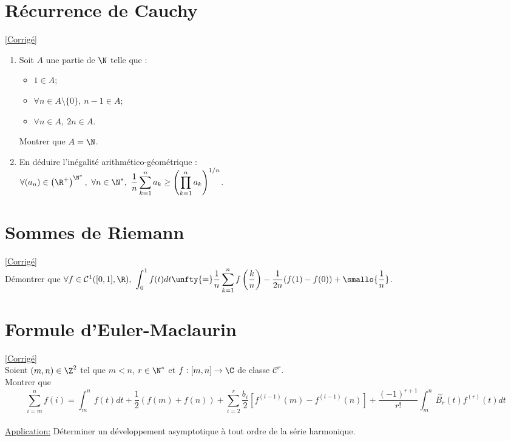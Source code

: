 \documentclass{book}
\begin{document}
	\section{Récurrence de Cauchy }
	\textcolor{blue}{\hyperref[sec:recurrence-de-cauchy]{[Corrigé]}}\\
	\label{Récurrence de Cauchy}
	\begin{enumerate}[leftmargin=*]
		\item Soit $A$ une partie de $\N$ telle que :
		\begin{itemize}
			\item $1\in A$;
			\item $\forall n\in A\setminus\{0\},\ n-1\in A$;
			\item $\forall n\in A,\ 2n\in A$.
		\end{itemize}
		Montrer que $A=\N$.
		\item En déduire l'inégalité arithmético-géométrique :\\
		$\forall (a_n)\in \left(\R^+\right)^{\N^*},\ \forall n\in\N^*,\ \displaystyle\frac{1}{n}\sum\limits_{k=1}^na_k\geq \left(\prod\limits_{k=1}^na_k\right)^{1/n}$.
	\end{enumerate}
	
	\section{Sommes de Riemann }
	\textcolor{blue}{\hyperref[sec:sommes-de-riemann]{[Corrigé]}}\\
	\label{Sommes de Riemann}
	Démontrer que $\forall f \in \mathcal{C}^1([0,1],\R),\ \displaystyle\int_0^1 f(t)dt\unfty{=}\displaystyle\frac{1}{n}\displaystyle\sum\limits_{k=1}^{n} f\left(\frac{k}{n}\right)-\displaystyle\frac{1}{2n}(f(1)-f(0))+\smallo{\frac{1}{n}}$.
	
	\section{Formule d'Euler-Maclaurin }
	\textcolor{blue}{\hyperref[sec:formule-deuler-maclaurin]{[Corrigé]}}\\
	\label{Formule d'Euler-Maclaurin}
	Soient $(m,n) \in \Z^2$ tel que $m<n$, $r \in \N^*$ et $f:[m,n] \to \C$ de classe $\mathcal{C}^r$.
	\\Montrer que $$\sum_{i=m}^{n} f(i)=\int_m^n f(t)dt +\frac{1}{2}(f(m)+f(n))+\sum_{i=2}^{r}\frac{b_i}{2}\left[f^{(i-1)}(m)-f^{(i-1)}(n)\right]+\frac{(-1)^{r+1}}{r!}\int_m^n \overset{\sim}{B_r}(t)f^{(r)}(t)dt$$
	\\ \underline{Application:} Déterminer un développement asymptotique à tout ordre de la série harmonique.
	
\end{document}
